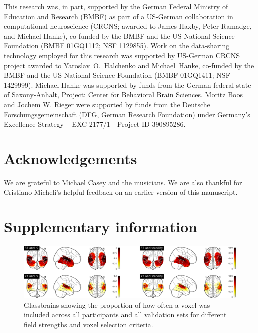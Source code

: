 This research was, in part, supported by the German Federal Ministry of
Education and Research (BMBF) as part of a US-German collaboration in
computational neuroscience (CRCNS; awarded to James Haxby, Peter Ramadge, and
Michael Hanke), co-funded by the BMBF and the US National Science Foundation
(BMBF 01GQ1112; NSF 1129855).  Work on the data-sharing technology employed for
this research was supported by US-German CRCNS project awarded to
Yaroslav~O.~Halchenko and Michael~Hanke, co-funded by the BMBF and the US
National Science Foundation (BMBF 01GQ1411; NSF 1429999).  Michael Hanke was
supported by funds from the German federal state of Saxony-Anhalt, Project:
Center for Behavioral Brain Sciences.
Moritz Boos and Jochem W. Rieger were supported by funds from the Deutsche Forschungsgemeinschaft (DFG, German Research Foundation) under Germany's Excellence Strategy – EXC 2177/1 - Project ID 390895286.

\section*{Acknowledgements}

We are grateful to Michael Casey and the musicians.
We are also thankful for Cristiano Micheli's helpful feedback on an earlier version of this manuscript.



\beginsupplement
\newpage
\section*{Supplementary information} \label{supplemental}

\begin{figure}[H]
  \centering
  \includegraphics[width=\linewidth]{pics/glassbrains.png}
  \caption{Glassbrains showing the proportion of how often a voxel was included across all participants and all validation sets for different field strengths and voxel selection criteria.}

 \label{fig:glassbrains}\end{figure}


